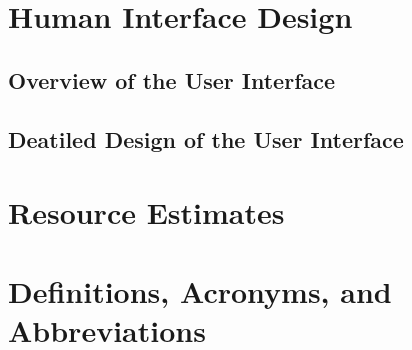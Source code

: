 \documentclass[11pt, a4paper]{report}
\begin{document}
\pagebreak


\chapter{Human Interface Design}%
\label{cha:HID}

\section{Overview of the User Interface}


\section{Deatiled Design of the User Interface}


\pagebreak




\chapter{Resource Estimates} %
\label{cha:RE}


\pagebreak

\chapter{Definitions, Acronyms, and Abbreviations} %
\label{cha:DAA}


\pagebreak
\newpage
\appendix

\pagebreak

\chapter{}
\end{document}
